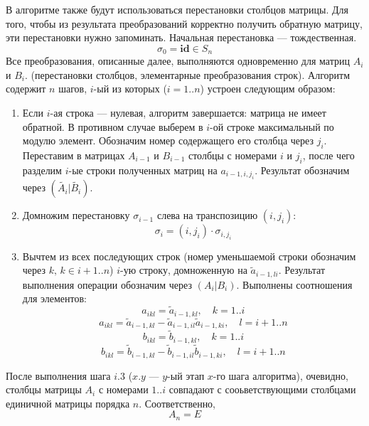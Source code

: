 \documentclass{article}
\begin{document}
В алгоритме также будут использоваться перестановки столбцов матрицы. Для того, чтобы из результата преобразований корректно получить обратную матрицу, эти перестановки нужно запоминать. Начальная перестановка --- тождественная.
$$ \sigma_0 = \textbf{id} \in S_n $$
Все преобразования, описанные далее, выполняются одновременно для матриц $A_i$ и $B_i$. (перестановки столбцов, элементарные преобразования строк).
Алгоритм содержит $n$ шагов, $i$-ый из которых ($i=1..n$) устроен следующим образом:
\begin{enumerate}

\item Если $i$-ая строка --- нулевая, алгоритм завершается: матрица не имеет обратной. В противном случае выберем в $i$-ой строке максимальный по модулю элемент. Обозначим номер содержащего его столбца через $j_i$. Переставим в матрицах $A_{i-1}$ и $B_{i-1}$ столбцы с номерами $i$ и $j_i$, после чего разделим $i$-ые строки полученных матриц на $a_{i-1,i,j_i}$. Результат обозначим через $(\tilde{A_i}|\tilde{B_i})$.

\item Домножим перестановку $\sigma_{i-1}$ слева на транспозицию $(i,j_i)$:
$$ \sigma_i = (i,j_i) \cdot \sigma_{i,j_i} $$

\item Вычтем из всех последующих строк (номер уменьшаемой строки обозначим через $k,\,k\in i+1..n$) $i$-ую строку, домноженную на $\tilde{a}_{i-1,li}$. Результат выполнения операции обозначим через $(A_i|B_i)$. Выполнены соотношения для элементов:
$$ a_{ikl} = \tilde{a}_{i-1,kl},\quad k=1..i $$
$$ a_{ikl} = \tilde{a}_{i-1,kl} - \tilde{a}_{i-1,il}\tilde{a}_{i-1,ki},\quad l=i+1..n $$
$$ b_{ikl} = \tilde{b}_{i-1,kl},\quad k=1..i $$
$$ b_{ikl} = \tilde{b}_{i-1,kl} - \tilde{b}_{i-1,il}\tilde{b}_{i-1,ki},\quad l=i+1..n $$ 

\end{enumerate}

После выполнения шага $i.3$ ($x.y$ --- $y$-ый этап $x$-го шага алгоритма), очевидно, столбцы матрицы $A_i$ с номерами $1..i$ совпадают с сооьветствующими столбцами единичной матрицы порядка $n$. Соответственно, $$A_n = E$$
\end{document}
